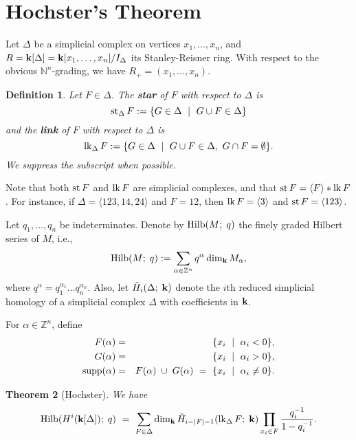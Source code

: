 \documentclass{amsart}
\newtheorem{thm}{Theorem}
\newtheorem{defn}[thm]{Definition}
\renewcommand{\star}{\mathop{\rm st}\nolimits}
\newcommand{\link}{\mathop{\rm 
lk}\nolimits}
\newcommand{\st}{~\mid~}
\newcommand{\0}{\emptyset}
\newcommand{\Hilb}{\mathop{\rm Hilb}\nolimits}
\newcommand{\supp}{\mathop{\rm supp}\nolimits}
\newcommand{\fld}{{\bf k}}
\newcommand{\NN}{{\mathbb N}}
\newcommand{\ZZ}{{\mathbb Z}}
\newcommand{\defterm}[1] {{\bf #1}}
\begin{document}
\section{Hochster's Theorem}

Let $\Delta$ be a simplicial complex on vertices $x_1, \dots, x_n$, and
$R=\fld[\Delta]=\fld[x_1, \dots, x_n]/I_\Delta$ its Stanley-Reisner ring.  With respect to the
obvious $\NN^n$-grading, we have $R_+ = (x_1, \dots, x_n)$.

\begin{defn} Let $F \in \Delta$.  The \defterm{star} of $F$ with respect to $\Delta$ is
	$$\star_\Delta F := \{ G \in \Delta \st G \cup F \in \Delta \}$$
and the \defterm{link} of $F$ with respect to $\Delta$ is
        $$\link_\Delta F := \{ G \in \Delta \st G \cup F \in \Delta, ~ G \cap F = \0\}.$$
We suppress the subscript when possible.
\end{defn}

Note that both $\star F$ and $\link F$ are simplicial complexes, and that $\star F = \langle F
\rangle * \link F$. For instance, if $\Delta = \langle 123, 14, 24 \rangle$ and $F = 12$, then
$\link F = \langle 3 \rangle$ and $\star F = \langle 123 \rangle$.

Let $q_1, \dots, q_n$ be indeterminates.  Denote by $\Hilb(M;\;q)$ the finely graded Hilbert
series of $M$, i.e.,
	$$\Hilb(M;\;q) := \sum_{\alpha \in \ZZ^n} q^\alpha \dim_\fld M_\alpha,$$
where $q^\alpha = q_1^{\alpha_1} \dots q_n^{\alpha_n}$.  Also, let $\tilde H_i(\Delta;\;\fld)$ 
denote the $i$th reduced simplicial homology of a simplicial
complex $\Delta$ with coefficients in $\fld$.

For $\alpha \in \ZZ^n$, define
	\begin{eqnarray*}
	F(\alpha) &=& \{x_i \st \alpha_i < 0\}, \\
	G(\alpha) &=& \{x_i \st \alpha_i > 0\}, \\
	\supp(\alpha) &=& F(\alpha) \;\cup\; G(\alpha) ~=~ \{x_i \st \alpha_i \neq 0\}.
	\end{eqnarray*}

\begin{thm}[Hochster] 
We have
	$$\Hilb(H^i(\fld[\Delta]);\;q) ~=~ \sum_{F \in \Delta} \dim_\fld \tilde
	H_{i-|F|-1}(\link_\Delta F;\;\fld) \prod_{x_i \in F} \frac{q_i^{-1}}{1-q_i^{-1}}.$$
\end{thm}
\end{document}
